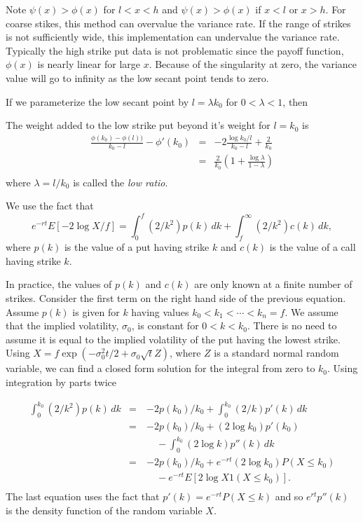 \documentclass[11pt,fleqn]{amsart}
\begin{document}
Note $\psi(x) > \phi(x)$ for $l < x < h$ and $\psi(x) > \phi(x)$ if
$x < l$ or $x > h$. For coarse stikes, this method can overvalue the
variance rate. If the range of strikes is not sufficiently wide, this
 implementation can undervalue the variance rate. Typically the high
strike put data is not problematic since the payoff function, $\phi(x)$
 is nearly linear for large $x$. Because of the singularity at zero, the
variance value will go to infinity as the low secant point tends to zero.

If we parameterize the low secant point by $l = \lambda k_0$ for
$0 < \lambda < 1$, then 

The weight added to the low strike put
beyond it's weight for $l = k_0$ is
\begin{eqnarray*}
	\frac{\phi(k_0) - \phi(l))}{k_0 - l} - \phi'(k_0) 
		&=& -2\frac{\log k_0/l}{k_0 - l} + \frac{2}{k_0} \\
		&=& \frac{2}{k_0} (1 + \frac{\log\lambda}{1 - \lambda})  \\
\end{eqnarray*}
where $\lambda = l/k_0$ is called the {\em low ratio}.

We use the fact that
\begin{equation*}
	e^{-rt} E[-2\log X/f] = \int_0^f (2/k^2) p(k)\,dk
		+ \int_f^\infty (2/k^2) c(k)\,dk,
\end{equation*}
where $p(k)$ is the value of a put having strike $k$ and
$c(k)$ is the value of a call having strike $k$.

In practice, the values of $p(k)$ and $c(k)$ are only known at a finite
number of strikes. Consider the first term on the right hand side of
the previous equation.  Assume $p(k)$ is given for $k$ having values
$k_0 < k_1 < \cdots < k_n = f$.  We assume that the implied volatility,
$\sigma_0$, is constant for $0 < k < k_0$. There is no need to assume it
is equal to the implied volatility of the put having the lowest strike.
Using $X = f\exp(- \sigma_0^2 t/2 + \sigma_0\sqrt{t} Z)$, where $Z$ is
a standard normal random variable, we can find a closed form solution
for the integral from zero to $k_0$.  Using integration by parts twice

\begin{eqnarray*}
	\int_0^{k_0} (2/k^2) p(k)\,dk
		&=& -2p(k_0)/k_0 + \int_0^{k_0} (2/k) p'(k)\,dk \\
		&=& -2p(k_0)/k_0 + (2\log k_0) p'(k_0) \\
		&\quad&\quad - \int_0^{k_0} (2\log k) p''(k)\,dk \\
		&=& -2p(k_0)/k_0 + e^{-rt}(2\log k_0) P(X \le k_0) \\
		&\quad&\quad -e^{-rt}E[2\log X 1(X \le k_0)].\\
\end{eqnarray*}
The last equation uses the fact that $p'(k) = e^{-rt}P(X \le k)$ and
so $e^{rt}p''(k)$ is the density function of the random variable $X$.
\end{document}
